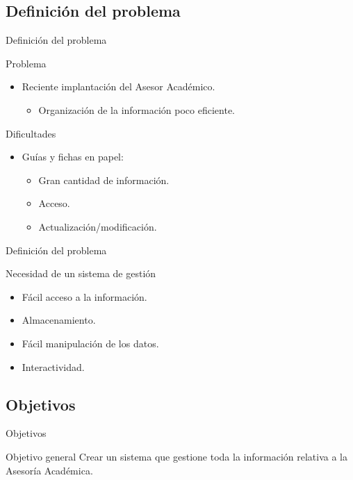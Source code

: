 \documentclass[10pt, hyperref={pdfpagelabels=false}]{beamer}
\begin{document}
    \subsection{Definición del problema}
      \begin{frame}{Definición del problema}
        \begin{block}{Problema}
          \begin{itemize}
           \item Reciente implantación del Asesor Académico.
           \begin{itemize}
            \item Organización de la información poco eficiente.
           \end{itemize}
          \end{itemize}
         \end{block}
         \begin{block}{Dificultades}
          \begin{itemize}
           \item Guías y fichas en papel:
           \begin{itemize}
            \item Gran cantidad de información.
            \item Acceso.
            \item Actualización/modificación.
           \end{itemize}
          \end{itemize}
        \end{block}
      \end{frame}

      \begin{frame}{Definición del problema}
        \begin{block}{Necesidad de un sistema de gestión}
          \begin{itemize}
           \item Fácil acceso a la información.
           \item Almacenamiento.
           \item Fácil manipulación de los datos.
           \item Interactividad.
          \end{itemize}
        \end{block}
      \end{frame}


    \subsection{Objetivos}
      \begin{frame}{Objetivos}
        \begin{block}{Objetivo general}
        Crear un sistema que gestione toda la información relativa a la Asesoría
        Académica.
        \end{block}
      \end{frame}
\end{document}
